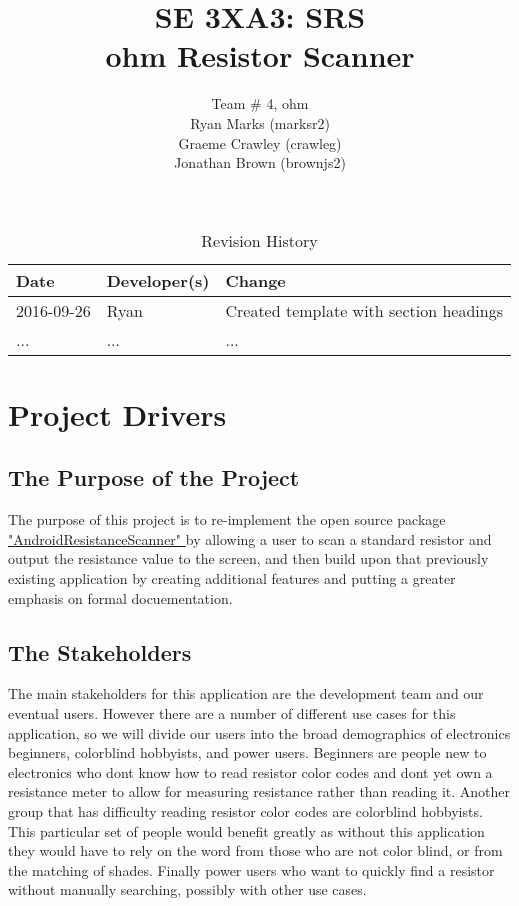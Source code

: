 \documentclass{article}
\title{SE 3XA3: SRS\\ohm Resistor Scanner}
\author{Team \# 4, ohm
		\\ Ryan Marks (marksr2)
		\\ Graeme Crawley (crawleg)
		\\ Jonathan Brown (brownjs2)
}
\date{}
\begin{document}
\begin{table}[hp]
\caption{Revision History} \label{TblRevisionHistory}
\begin{tabularx}{\textwidth}{llX}
\toprule
\textbf{Date} & \textbf{Developer(s)} & \textbf{Change}\\
\midrule
2016-09-26 & Ryan & Created template with section headings\\
... & ... & ...\\
\bottomrule
\end{tabularx}
\end{table}

\newpage

\maketitle



\section{Project Drivers}

\subsection{The Purpose of the Project }
The purpose of this project is to re-implement the open source package \href{https://github.com/sumeetkr/AndroidResistorScanner}{ "AndroidResistanceScanner" } by allowing a user to scan a standard resistor and output the resistance value to the screen, and then build upon that previously existing application by creating additional features and putting a greater emphasis on formal docuementation.

\subsection{The Stakeholders}
The main stakeholders for this application are the development team and our eventual users. However there are a number of different use cases for this application, so we will divide our users into the broad demographics of electronics beginners, colorblind hobbyists, and power users. Beginners are people new to electronics who dont know how to read resistor color codes and dont yet own a resistance meter to allow for measuring resistance rather than reading it. Another group that has difficulty reading resistor color codes are colorblind hobbyists. This particular set of people would benefit greatly as without this application they would have to rely on the word from those who are not color blind, or from the matching of shades. Finally power users who want to quickly find a resistor without manually searching, possibly with other use cases.
\end{document}
